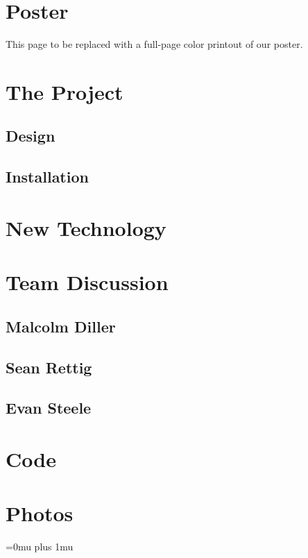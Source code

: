 \documentclass[10pt,draftclsnofoot,onecolumn]{IEEEtran}
\begin{document}
\section{Poster}
\newpage
This page to be replaced with a full-page color printout of our poster.
\newpage
\section{The Project}
\subsection{Design}

\subsection{Installation}

\section{New Technology}

\section{Team Discussion}
\subsection{Malcolm Diller}
\subsection{Sean Rettig}
\subsection{Evan Steele}

\newpage
\section{Code}

\section{Photos}
\Urlmuskip=0mu plus 1mu\relax


\end{document}
